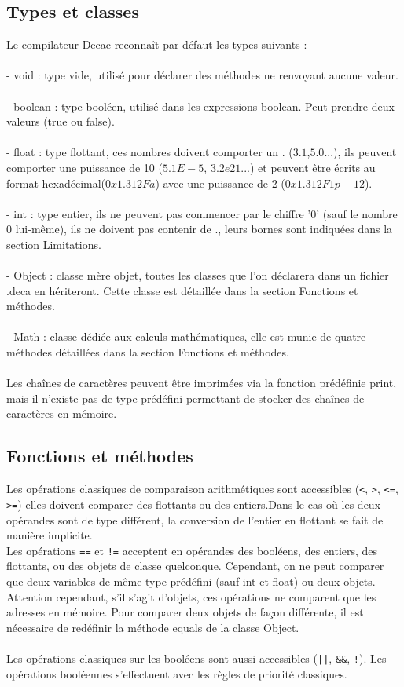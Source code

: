 \documentclass[12pt]{article}
\begin{document}
\subsection{Types et classes}
Le compilateur Decac reconnaît par défaut les types suivants :\\
\\- void : type vide, utilisé pour déclarer des méthodes ne renvoyant aucune valeur.\\
\\- boolean : type booléen, utilisé dans les expressions boolean. Peut prendre deux valeurs (true ou
false).\\
\\- float : type flottant, ces nombres doivent comporter un . ($3.1$,$5.0$...),
ils peuvent comporter une puissance de 10 ($5.1E-5$, $3.2e21$...) et peuvent
être écrits au format hexadécimal($0x1.312Fa$)
avec une puissance de 2 ($0x1.312F1p+12$).\\
\\- int : type entier, ils ne peuvent pas commencer par le chiffre '0' (sauf le nombre 0 lui-même), ils ne doivent pas contenir de ., leurs bornes sont indiquées dans la section Limitations.\\
\\- Object : classe mère objet, toutes les classes que l'on déclarera dans un fichier .deca en hériteront. Cette classe est détaillée dans la section Fonctions et méthodes.\\
\\- Math : classe dédiée aux calculs mathématiques, elle est munie de quatre méthodes détaillées dans la section Fonctions et méthodes.\\
\\
Les chaînes de caractères peuvent être imprimées via la fonction prédéfinie print, mais il n'existe pas de type prédéfini permettant de stocker
des chaînes de caractères en mémoire.
\subsection{Fonctions et méthodes}
Les opérations classiques de comparaison arithmétiques sont accessibles (\verb?<?, \verb?>?, \verb?<=?, \verb?>=?) elles doivent comparer des flottants 
ou des entiers.Dans le cas où les deux opérandes sont de type différent, la conversion de l'entier en flottant se fait de manière implicite.\\
Les opérations \verb?==? et \verb?!=? acceptent en opérandes des booléens, des entiers, des flottants, ou des objets de classe quelconque. Cependant, on ne peut 
comparer que deux variables de même type prédéfini (sauf int et float) ou deux objets.
Attention cependant, s'il s'agit d'objets, ces opérations ne comparent que les adresses en mémoire. Pour comparer deux objets de façon différente, il est nécessaire de 
redéfinir la méthode equals de la classe Object.\\
\\
Les opérations classiques sur les booléens sont aussi accessibles (\verb?||?, \verb?&&?, \verb?!?). Les opérations booléennes s'effectuent avec les règles de priorité classiques.\\
\end{document}
